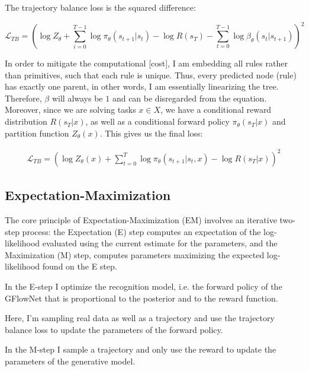 The trajectory balance loss is the squared difference:

\begin{equation}
    \mathcal{L}_{TB} = \left(\log Z_\theta + \sum_{i=0}^{T-1} \log \pi_\theta(s_{t+1}|s_{t}) - \log R(s_T) - \sum_{t=0}^{T-1} \log \beta_\theta(s_{t}|s_{t+1})\right)^2
\end{equation}

In order to mitigate the computational [cost], I am embedding all rules rather than primitives, such that each rule is unique. Thus, every predicted node (rule) has exactly one parent, in other words, I am essentially linearizing the tree. Therefore, $\beta$ will always be $1$ and can be disregarded from the equation. 
Moreover, since we are solving tasks \( x \in X \), we have a conditional reward distribution $R(s_T|x)$, as well as a conditional forward policy $\pi_\theta(s_T|x)$ and partition function $Z_\theta(x)$.
This gives us the final loss:

\begin{align}
     \mathcal{L}_{TB} = \left(\log Z_\theta(x) + \sum_{t=0}^{T} \log \pi_\theta(s_{t+1}|s_{t}, x) - \log R(s_T \vert x)\right)^2
\end{align}     




\subsection{Expectation-Maximization}


The core principle of Expectation-Maximization (EM) involves an iterative two-step process: the Expectation (E) step computes an expectation of the log-likelihood evaluated using the current estimate for the parameters, and the Maximization (M) step, computes parameters maximizing the expected log-likelihood found on the E step.

In the E-step I optimize the recognition model, i.e. the forward policy of the GFlowNet that is proportional to the posterior and to the reward function. 

Here, I'm sampling real data as well as a trajectory and use the trajectory balance loss to update the parameters of the forward policy.

In the M-step I sample a trajectory and only use the reward to update the parameters of the generative model.


